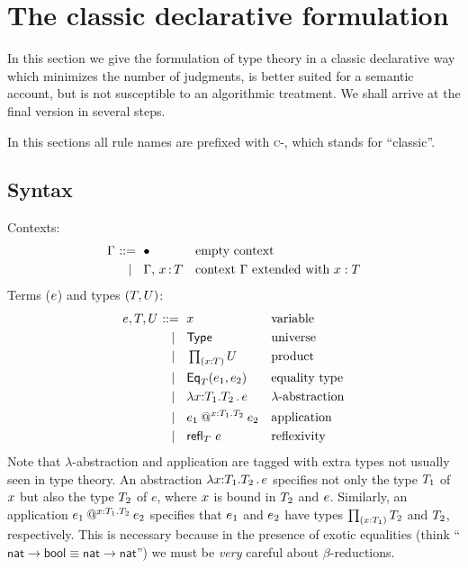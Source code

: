 \section{The classic declarative formulation}
\label{sec:classic-declarative-formulation}

In this section we give the formulation of type theory in a classic declarative way which
minimizes the number of judgments, is better suited for a semantic account, but is not
susceptible to an algorithmic treatment. We shall arrive at the final version in several
steps.

In this sections all rule names are prefixed with \textsc{c-}, which stands for ``classic''.

\subsection{Syntax}
\label{sec:syntax}

Contexts:
%
\begin{equation*}
  \Gamma
  \begin{aligned}[t]
    \ \mathrel{{:}{:}{=}}\    {}& \bullet & & \text{empty context}\\
    \ \mid\ \  {}& \Gamma,\, x\, {:}\, T & & \text{context $\Gamma$ extended with $x : T$}
  \end{aligned}
\end{equation*}
%
Terms ($e$) and types $(T, U)$:
%
\begin{equation*}
  e, T, U
  \begin{aligned}[t]
    \ \mathrel{{:}{:}{=}}\    {}&  x   &&\text{variable} \\
    \ \mid\ \  {}& \mathsf{Type} & & \text{universe}\\
    \ \mid\ \  {}& \mathop{\textstyle\prod_{(x {:} T)}} U & & \text{product}\\
    \ \mid\ \  {}& \mathsf{Eq}_{T}(e_1,e_2) & & \text{equality type} \\
    \ \mid\ \  {}&  \lambda x {:} T_1.T_2\,.\, e  &&\text{$\lambda$-abstraction} \\
    \ \mid\ \  {}&  e_1\mathbin{@^{x{:}T_1.T_2}} e_2  &&\text{application} \\
    \ \mid\ \  {}&  {\mathsf{refl}_{T}}\  e  &&\text{reflexivity} \\
  \end{aligned}
\end{equation*}
%
Note that $\lambda$-abstraction and application are tagged with extra types not usually
seen in type theory. An abstraction $\lambda x {:} T_1.T_2\,.\, e$ specifies not only the type
$T_1$ of $x$ but also the type $T_2$ of $e$, where $x$ is bound in $T_2$ and $e$.
Similarly, an application $e_1\mathbin{@^{x{:}T_1.T_2}} e_2$ specifies that $e_1$ and
$e_2$ have types $\mathop{\textstyle\prod_{(x {:} T_1)}} T_2$ and $T_2$, respectively. This is necessary
because in the presence of exotic equalities (think ``$\mathsf{nat} \to \mathsf{bool}
\equiv \mathsf{nat} \to \mathsf{nat}$'') we must be \emph{very} careful about
$\beta$-reductions.

